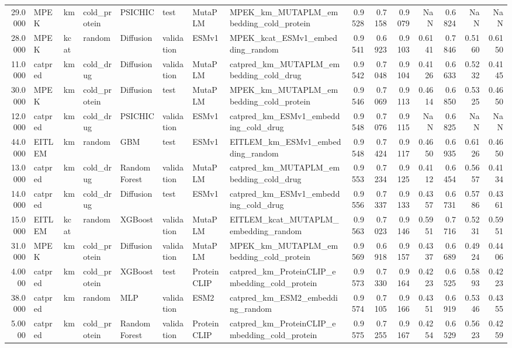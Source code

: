 \begin{tabular}{rlllllllrrrrrrr}
29.0000 & MPEK & km & cold_protein & PSICHIC & test & MutaPLM & MPEK_km_MUTAPLM_embedding_cold_protein & 0.9528 & 0.7158 & 0.9079 & NaN & 0.6824 & NaN & NaN \\
28.0000 & MPEK & kcat & random & Diffusion & validation & ESMv1 & MPEK_kcat_ESMv1_embedding_random & 0.9541 & 0.6923 & 0.9103 & 0.6141 & 0.7846 & 0.5160 & 0.6150 \\
11.0000 & catpred & km & cold_drug & Diffusion & validation & MutaPLM & catpred_km_MUTAPLM_embedding_cold_drug & 0.9542 & 0.7048 & 0.9104 & 0.4126 & 0.6633 & 0.5232 & 0.4145 \\
30.0000 & MPEK & km & cold_protein & Diffusion & test & MutaPLM & MPEK_km_MUTAPLM_embedding_cold_protein & 0.9546 & 0.7069 & 0.9113 & 0.4614 & 0.6850 & 0.5325 & 0.4650 \\
12.0000 & catpred & km & cold_drug & PSICHIC & validation & ESMv1 & catpred_km_ESMv1_embedding_cold_drug & 0.9548 & 0.7076 & 0.9115 & NaN & 0.6825 & NaN & NaN \\
44.0000 & EITLEM & km & random & GBM & test & ESMv1 & EITLEM_km_ESMv1_embedding_random & 0.9548 & 0.7424 & 0.9117 & 0.4650 & 0.6935 & 0.6126 & 0.4650 \\
13.0000 & catpred & km & cold_drug & Random Forest & validation & MutaPLM & catpred_km_MUTAPLM_embedding_cold_drug & 0.9553 & 0.7234 & 0.9125 & 0.4112 & 0.6454 & 0.5657 & 0.4134 \\
14.0000 & catpred & km & cold_drug & Diffusion & test & ESMv1 & catpred_km_ESMv1_embedding_cold_drug & 0.9556 & 0.7337 & 0.9133 & 0.4357 & 0.6731 & 0.5786 & 0.4361 \\
15.0000 & EITLEM & kcat & random & XGBoost & validation & MutaPLM & EITLEM_kcat_MUTAPLM_embedding_random & 0.9563 & 0.7023 & 0.9146 & 0.5951 & 0.7716 & 0.5231 & 0.5951 \\
31.0000 & MPEK & km & cold_protein & Diffusion & validation & MutaPLM & MPEK_km_MUTAPLM_embedding_cold_protein & 0.9569 & 0.6918 & 0.9157 & 0.4337 & 0.6689 & 0.4924 & 0.4406 \\
4.0000 & catpred & km & cold_protein & XGBoost & test & ProteinCLIP & catpred_km_ProteinCLIP_embedding_cold_protein & 0.9573 & 0.7330 & 0.9164 & 0.4223 & 0.6525 & 0.5893 & 0.4223 \\
38.0000 & catpred & km & random & MLP & validation & ESM2 & catpred_km_ESM2_embedding_random & 0.9574 & 0.7105 & 0.9166 & 0.4351 & 0.6919 & 0.5346 & 0.4355 \\
5.0000 & catpred & km & cold_protein & Random Forest & validation & ProteinCLIP & catpred_km_ProteinCLIP_embedding_cold_protein & 0.9575 & 0.7255 & 0.9167 & 0.4254 & 0.6529 & 0.5623 & 0.4259 \\

\end{tabular}
